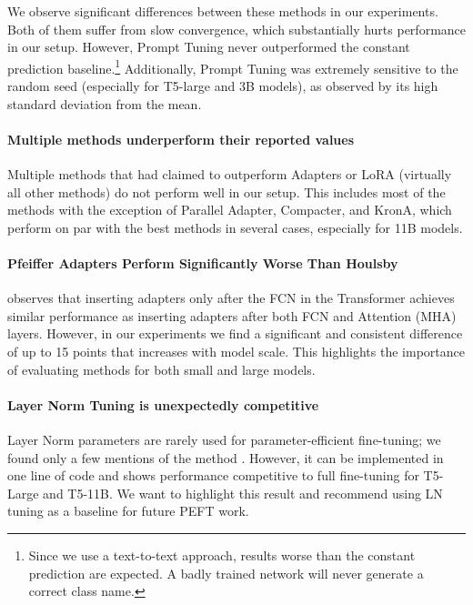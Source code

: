We observe significant differences between these methods in our experiments. Both of them suffer from slow convergence, which substantially hurts performance in our setup. However, Prompt Tuning never outperformed the constant prediction baseline.\footnote{Since we use a text-to-text approach, results worse than the constant prediction are expected. A badly trained network will never generate a correct class name.} Additionally, Prompt Tuning was extremely sensitive to the random seed (especially for T5-large and 3B models), as observed by its high standard deviation from the mean.

\paragraph{Multiple methods underperform their reported values}

Multiple methods that had claimed to outperform Adapters or LoRA (virtually all other methods) do not perform well in our setup. This includes most of the methods with the exception of Parallel Adapter, Compacter, and KronA, which perform on par with the best methods in several cases, especially for 11B models.

\paragraph{Pfeiffer Adapters Perform Significantly Worse Than Houlsby}

\citet{adapter_fusion} observes that inserting adapters only after the FCN in the Transformer achieves similar performance as inserting adapters after both FCN and Attention (MHA) layers. However, in our experiments we find a significant and consistent difference of up to 15 points that increases with model scale. This highlights the importance of evaluating methods for both small and large models.

\paragraph{Layer Norm Tuning is unexpectedly competitive}

Layer Norm parameters are rarely used for parameter-efficient fine-tuning; we found only a few mentions of the method \citep{layer_norm_tuning,t_few}. However, it can be implemented in one line of code and shows performance competitive to full fine-tuning for T5-Large and T5-11B. We want to highlight this result and recommend using LN tuning as a baseline for future PEFT work.


